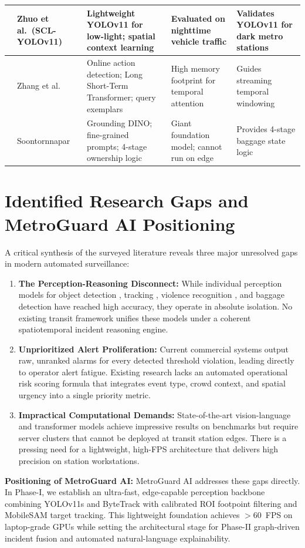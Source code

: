 \documentclass[12pt,a4paper]{report}
\begin{document}
\begin{table}[H]
\begin{tabular}{|c|p{3.2cm}|p{3.8cm}|p{3.8cm}|p{3.2cm}|}
\cite{p19} & Zhuo et al.\ (SCL-YOLOv11) & Lightweight YOLOv11 for low-light; spatial context learning & Evaluated on nighttime vehicle traffic & Validates YOLOv11 for dark metro stations \\ \hline
\cite{p20} & Zhang et al. & Online action detection; Long Short-Term Transformer; query exemplars & High memory footprint for temporal attention & Guides streaming temporal windowing \\ \hline
\cite{p21} & Soontornnapar & Grounding DINO; fine-grained prompts; 4-stage ownership logic & Giant foundation model; cannot run on edge & Provides 4-stage baggage state logic \\ \hline
\end{tabular}
\end{table}

\section{Identified Research Gaps and MetroGuard AI Positioning}
A critical synthesis of the surveyed literature reveals three major unresolved gaps in modern automated surveillance:
\begin{enumerate}
    \item \textbf{The Perception-Reasoning Disconnect:} While individual perception models for object detection \cite{p7, p19}, tracking \cite{p7, p18}, violence recognition \cite{p8, p14}, and baggage detection \cite{p6, p21} have reached high accuracy, they operate in absolute isolation. No existing transit framework unifies these models under a coherent spatiotemporal incident reasoning engine.
    \item \textbf{Unprioritized Alert Proliferation:} Current commercial systems output raw, unranked alarms for every detected threshold violation, leading directly to operator alert fatigue. Existing research lacks an automated operational risk scoring formula that integrates event type, crowd context, and spatial urgency into a single priority metric.
    \item \textbf{Impractical Computational Demands:} State-of-the-art vision-language and transformer models \cite{p5, p18, p21} achieve impressive results on benchmarks but require server clusters that cannot be deployed at transit station edges. There is a pressing need for a lightweight, high-FPS architecture that delivers high precision on station workstations.
\end{enumerate}

\noindent \textbf{Positioning of MetroGuard AI:} MetroGuard AI addresses these gaps directly. In Phase-I, we establish an ultra-fast, edge-capable perception backbone combining YOLOv11s and ByteTrack with calibrated ROI footpoint filtering and MobileSAM target tracking. This lightweight foundation achieves $>60$~FPS on laptop-grade GPUs while setting the architectural stage for Phase-II graph-driven incident fusion and automated natural-language explainability.
\end{document}
